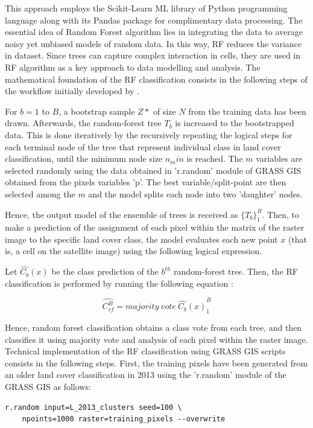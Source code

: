 \documentclass[final,5p,times,twocolumn]{elsarticle}
\begin{document}
This approach employs the Scikit-Learn ML library of Python programming language along with its Pandas package for complimentary data processing. The essential idea of Random Forest algorithm lies in integrating the data to average noisy yet unbiased models of random data. In this way, RF reduces the variance in dataset. Since trees can capture complex interaction in cells, they are used in RF algorithm as a key approach to data modelling and analysis. The mathematical foundation of the RF classification consists in the following steps of the workflow initially developed by \cite{598994}. 

For $b=1$ to $B$, a bootstrap sample $Z*$ of size $N$ from the training data has been drawn. Afterwards, the random-forest tree $T_b$ is increased to the bootstrapped data. This is done iteratively by the recursively repeating the logical steps for each terminal node of the tree that represent individual class in land cover classification, until the minimum node size $n_min$ is reached. The $m$ variables are selected randomly using the data obtained in 'r.random' module of GRASS GIS obtained from the pixels variables 'p'. The best variable/split-point are then selected among the $m$ and the model splits each node into two 'daughter' nodes. 

Hence, the output model of the ensemble of trees is received as $\{T_b\}_1^B$. Then, to make a prediction of the assignment of each pixel within the matrix of the raster image to the specific land cover class, the model evaluates each new point $x$ (that is, a cell on the satellite image) using the following logical expression. 

Let $\hat{C_b}(x)$ be the class prediction of the $b^{th}$ random-forest tree. Then, the RF classification is performed by running the following equation \cite{709601}:

\begin{equation}
\hat{C^B_{rf}} = majority \:  vote \:  {\hat{C_b}(x)}_1^B
\end{equation}

Hence, random forest classification obtains a class vote from each tree, and then classifies it using majority vote and analysis of each pixel within the raster image. Technical implementation of the RF classification using GRASS GIS scripts consists in the following steps. First, the training pixels have been generated from an older land cover classification in 2013 using the 'r.random' module of the GRASS GIS as follows: 

\begin{verbatim}
r.random input=L_2013_clusters seed=100 \
	npoints=1000 raster=training_pixels --overwrite
\end{verbatim}
\end{document}
